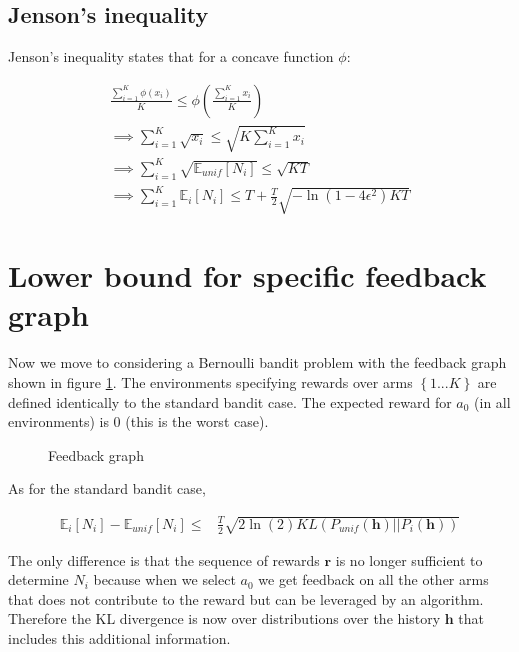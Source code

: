 \documentclass{article}
\newcommand{\E}{\mathbb E}
\newcommand{\set}[1]{\left\{#1\right\}}
\newcommand{\eqn}[1]{\begin{align}#1\end{align}}
\renewcommand{\Pi}[1]{P_i\left( #1 \right)}
\newcommand{\Pu}[1]{P_{unif}\left( #1 \right)}
\newcommand{\Ei}[1]{\E_i\left[ #1 \right]}
\newcommand{\Eu}[1]{\E_{unif}\left[ #1 \right]}
\renewcommand{\r}{\boldsymbol{r}}
\newcommand{\kl}[2]{KL\left(#1 || #2 \right)}
\theoremstyle{plain}
\theoremstyle{definition}
\begin{document}
\subsection{Jenson's inequality}
Jenson's inequality states that for a concave function $\phi$:

\eqn{
\frac{\sum_{i=1}^K \phi(x_i)}{K} \leq \phi \left(\frac{\sum_{i=1}^K x_i}{K} \right) \\
\implies \sum_{i=1}^K \sqrt{x_i} \leq \sqrt{K\sum_{i=1}^K x_i}\\
\implies  \sum_{i=1}^K \sqrt{\Eu{N_i}} \leq \sqrt{KT} \\
\implies \sum_{i=1}^K\Ei{N_i} \leq T+ \frac{T}{2} \sqrt{-\ln(1-4\epsilon^2)KT}
}

\section{Lower bound for specific feedback graph}

Now we move to considering a Bernoulli bandit problem with the feedback graph shown in figure \ref{fig:feedbackgraph}. The environments specifying rewards over arms $\set{1...K}$ are defined identically to the standard bandit case. The expected reward for $a_0$ (in all environments) is $0$ (this is the worst case).


\begin{figure}[h]
\centering
\caption{Feedback graph}
\label{fig:feedbackgraph}
\end{figure}

As for the standard bandit case,

\eqn{
\Ei{N_i} -\Eu{N_i} \leq & \frac{T}{2}\sqrt{2\ln({2})\kl{\Pu{\boldsymbol{h}}}{\Pi{\boldsymbol{h}}}} 
}

The only difference is that the sequence of rewards $\r$ is no longer sufficient to determine $N_i$ because when we select $a_0$ we get feedback on all the other arms that does not contribute to the reward but can be leveraged by an algorithm. Therefore the KL divergence is now over distributions over the history $\boldsymbol{h}$ that includes this additional information. 
\end{document}
